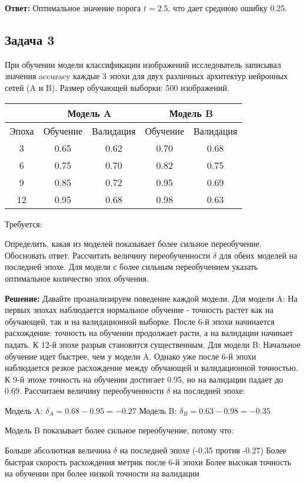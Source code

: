 \textbf{Ответ:} Оптимальное значение порога $t = 2.5$, что дает среднюю ошибку 0.25.

\subsection*{Задача 3}
При обучении модели классификации изображений исследователь записывал значения accuracy каждые 3 эпохи для двух различных архитектур нейронных сетей (A и B). Размер обучающей выборки: 500 изображений.
\begin{center}
\begin{tabular}{|c|c|c|c|c|}
\hline
& \multicolumn{2}{|c|}{Модель A} & \multicolumn{2}{|c|}{Модель B} \\
\hline
Эпоха & Обучение & Валидация & Обучение & Валидация \\
\hline
3 & 0.65 & 0.62 & 0.70 & 0.68 \\
6 & 0.75 & 0.70 & 0.82 & 0.75 \\
9 & 0.85 & 0.72 & 0.95 & 0.69 \\
12 & 0.95 & 0.68 & 0.98 & 0.63 \\
\hline
\end{tabular}
\end{center}
Требуется:

Определить, какая из моделей показывает более сильное переобучение. Обосновать ответ.
Рассчитать величину переобученности $\delta$ для обеих моделей на последней эпохе.
Для модели с более сильным переобучением указать оптимальное количество эпох обучения.

\textbf{Решение:}
Давайте проанализируем поведение каждой модели.
Для модели A:
На первых эпохах наблюдается нормальное обучение - точность растет как на обучающей, так и на валидационной выборке. После 6-й эпохи начинается расхождение: точность на обучении продолжает расти, а на валидации начинает падать. К 12-й эпохе разрыв становится существенным.
Для модели B:
Начальное обучение идет быстрее, чем у модели A. Однако уже после 6-й эпохи наблюдается резкое расхождение между обучающей и валидационной точностью. К 9-й эпохе точность на обучении достигает 0.95, но на валидации падает до 0.69.
Рассчитаем величину переобученности $\delta$ на последней эпохе:

Модель A: $\delta_A = 0.68 - 0.95 = -0.27$
Модель B: $\delta_B = 0.63 - 0.98 = -0.35$

Модель B показывает более сильное переобучение, потому что:

Больше абсолютная величина $\delta$ на последней эпохе (-0.35 против -0.27)
Более быстрая скорость расхождения метрик после 6-й эпохи
Более высокая точность на обучении при более низкой точности на валидации


